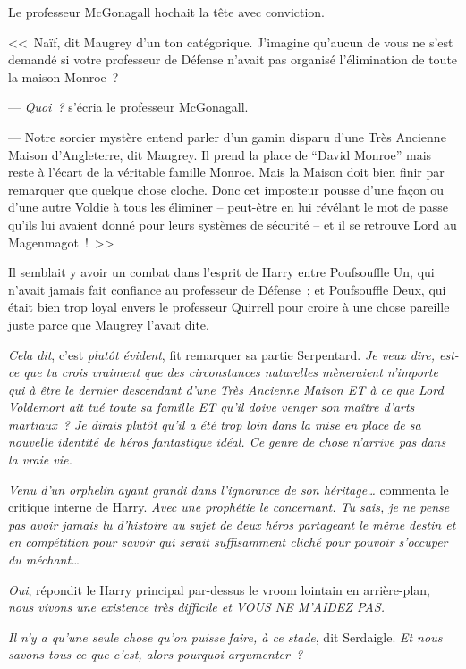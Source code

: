 Le professeur McGonagall hochait la tête avec conviction.

<<~Naïf, dit Maugrey d'un ton catégorique. J'imagine qu'aucun de vous ne s'est demandé si votre professeur de Défense n'avait pas organisé l'élimination de toute la maison Monroe~?

--- \emph{Quoi~?} s'écria le professeur McGonagall.

--- Notre sorcier mystère entend parler d'un gamin disparu d'une Très Ancienne Maison d'Angleterre, dit Maugrey. Il prend la place de “David Monroe” mais reste à l'écart de la véritable famille Monroe. Mais la Maison doit bien finir par remarquer que quelque chose cloche. Donc cet imposteur pousse d'une façon ou d'une autre Voldie à tous les éliminer -- peut-être en lui révélant le mot de passe qu'ils lui avaient donné pour leurs systèmes de sécurité -- et il se retrouve Lord au Magenmagot~!~>>

Il semblait y avoir un combat dans l'esprit de Harry entre Poufsouffle Un, qui n'avait jamais fait confiance au professeur de Défense~; et Poufsouffle Deux, qui était bien trop loyal envers le professeur Quirrell pour croire à une chose pareille juste parce que Maugrey l'avait dite.

\emph{Cela dit}, c'est \emph{plutôt évident}, fit remarquer sa partie Serpentard. \emph{Je veux dire, est-ce que tu crois vraiment que des circonstances naturelles mèneraient n'importe qui à être le dernier descendant d'une Très Ancienne Maison ET à ce que Lord Voldemort ait tué toute sa famille ET qu'il doive venger son maître d'arts martiaux~? Je dirais plutôt qu'il a été trop loin dans la mise en place de sa nouvelle identité de héros fantastique idéal. Ce genre de chose n'arrive pas dans la vraie vie.}

\emph{Venu d'un orphelin ayant grandi dans l'ignorance de son héritage…} commenta le critique interne de Harry. \emph{Avec une prophétie le concernant. Tu sais, je ne pense pas avoir jamais lu d'histoire au sujet de deux héros partageant le même destin et en compétition pour savoir qui serait suffisamment cliché pour pouvoir s'occuper du méchant…}

\emph{Oui}, répondit le Harry principal par-dessus le vroom lointain en arrière-plan, \emph{nous vivons une existence très difficile et VOUS NE M'AIDEZ PAS.}

\emph{Il n'y a qu'une seule chose qu'on puisse faire, à ce stade}, dit Serdaigle. \emph{Et nous savons tous ce que c'est, alors pourquoi argumenter~?}

